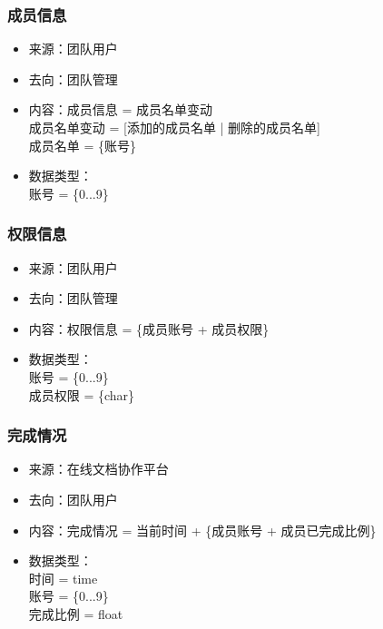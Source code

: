             \subsubsection{成员信息}
            \begin{itemize}
                \item 来源：团队用户
                \item 去向：团队管理
                \item 内容：成员信息 = 成员名单变动\\
                    成员名单变动 = [添加的成员名单 | 删除的成员名单]\\
                    成员名单 = \{账号\}\\
                \item 数据类型：\\
                    账号 = \{0...9\}\\
            \end{itemize}
            \subsubsection{权限信息}
            \begin{itemize}
                \item 来源：团队用户
                \item 去向：团队管理
                \item 内容：权限信息 = \{成员账号 + 成员权限\}
                \item 数据类型：\\
                账号 = \{0...9\} \\
                成员权限 = \{char\} \\
            \end{itemize}
            \subsubsection{完成情况}
            \begin{itemize}
                \item 来源：在线文档协作平台
                \item 去向：团队用户
                \item 内容：完成情况 = 当前时间 + \{成员账号 + 成员已完成比例\}
                \item 数据类型：\\
                时间 = time \\
                账号 = \{0...9\} \\
                完成比例 = float \\
            \end{itemize}
